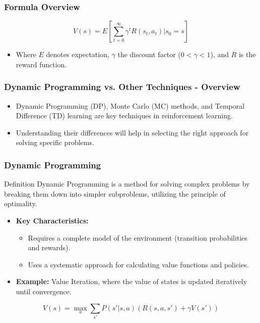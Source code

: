 \documentclass[aspectratio=169]{beamer}
\begin{document}
\begin{frame}[fragile]
    \frametitle{Formula Overview}
    \begin{equation}
        V(s) = E \left[ \sum_{t=0}^{\infty} \gamma^t R(s_t, a_t) | s_0 = s \right]
    \end{equation}
    \begin{itemize}
        \item Where $E$ denotes expectation, $\gamma$ the discount factor ($0 < \gamma < 1$), and $R$ is the reward function.
    \end{itemize}
\end{frame}

\begin{frame}[fragile]
    \frametitle{Dynamic Programming vs. Other Techniques - Overview}
    \begin{itemize}
        \item Dynamic Programming (DP), Monte Carlo (MC) methods, and Temporal Difference (TD) learning are key techniques in reinforcement learning.
        \item Understanding their differences will help in selecting the right approach for solving specific problems.
    \end{itemize}
\end{frame}

\begin{frame}[fragile]
    \frametitle{Dynamic Programming}
    \begin{block}{Definition}
        Dynamic Programming is a method for solving complex problems by breaking them down into simpler subproblems, utilizing the principle of optimality.
    \end{block}
    \begin{itemize}
        \item \textbf{Key Characteristics:}
            \begin{itemize}
                \item Requires a complete model of the environment (transition probabilities and rewards).
                \item Uses a systematic approach for calculating value functions and policies.
            \end{itemize}
        \item \textbf{Example:} Value Iteration, where the value of states is updated iteratively until convergence.
    \end{itemize}
    \begin{equation}
        V(s) = \max_a \sum_{s'} P(s'|s,a)(R(s,a,s') + \gamma V(s'))
    \end{equation}
\end{frame}
\end{document}
